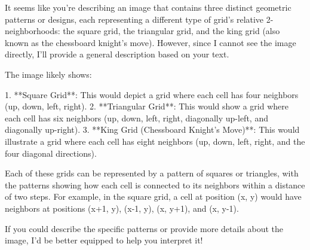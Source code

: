 It seems like you're describing an image that contains three distinct geometric patterns or designs, each representing a different type of grid's relative 2-neighborhoods: the square grid, the triangular grid, and the king grid (also known as the chessboard knight's move). However, since I cannot see the image directly, I'll provide a general description based on your text.

The image likely shows:

1. **Square Grid**: This would depict a grid where each cell has four neighbors (up, down, left, right).
2. **Triangular Grid**: This would show a grid where each cell has six neighbors (up, down, left, right, diagonally up-left, and diagonally up-right).
3. **King Grid (Chessboard Knight's Move)**: This would illustrate a grid where each cell has eight neighbors (up, down, left, right, and the four diagonal directions).

Each of these grids can be represented by a pattern of squares or triangles, with the patterns showing how each cell is connected to its neighbors within a distance of two steps. For example, in the square grid, a cell at position (x, y) would have neighbors at positions (x+1, y), (x-1, y), (x, y+1), and (x, y-1).

If you could describe the specific patterns or provide more details about the image, I'd be better equipped to help you interpret it!